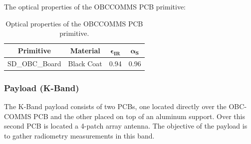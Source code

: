 \begin{table}[H]
  \centering
  \caption{Bulk properties of the OBC-COMMS PCB primitive.}
  \end{table}

The optical properties of the OBC\-COMMS PCB primitive:

\begin{table}[H]
  \centering
  \begin{tabular}{@{}cccc@{}}
  \toprule
  \textbf{Primitive} & \textbf{Material} & $\mathbf{\epsilon_{IR}}$ & $\mathbf{\alpha_{S}}$ \\ \midrule
  SD\_OBC\_Board & Black Coat       & 0.94                     & 0.96                  \\ \bottomrule
  \end{tabular}
  \caption{Optical properties of the OBC\-COMMS PCB primitive.}
\end{table}

\subsubsection{Payload (K-Band)}
The K-Band payload consists of two PCBs, one located directly over the OBC-COMMS PCB and the other
placed on top of an aluminum support. Over this second PCB is located a 4-patch array antenna. The objective
of the payload is to gather radiometry measurements in this band.

